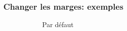 \documentclass{clic_latex_beamer}
\begin{document}
 \begin{frame}
\frametitle{Changer les marges: exemples}
\begin{figure}
        \centering
        \begin{subfigure}[b]{0.3\textwidth}
                \caption*{Par défaut}
        \end{subfigure}
        ~ 
        \begin{subfigure}[b]{0.3\textwidth}

\end{subfigure}
\end{figure}
\end{frame}
\end{document}
